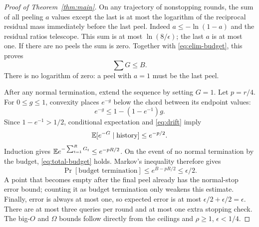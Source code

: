 \begin{proof}[Proof of Theorem~\ref{thm:main}]
On any trajectory of nonstopping rounds, the sum of all peeling $a$ values except the last is at most the logarithm of the reciprocal residual mass immediately before the last peel. Indeed $a\le-\ln(1-a)$ and the residual ratios telescope. This sum is at most $\ln(8/\epsilon)$; the last $a$ is at most one. If there are no peels the sum is zero. Together with \eqref{eq:elim-budget}, this proves
\begin{equation}\label{eq:total-budget}
 \sum G\le B.
\end{equation}
There is no logarithm of zero: a peel with $a=1$ must be the last peel.

After any normal termination, extend the sequence by setting $G=1$. Let $p=r/4$. For $0\le g\le1$, convexity places $e^{-g}$ below the chord between its endpoint values:
\[
 e^{-g}\le1-(1-e^{-1})g.
\]
Since $1-e^{-1}>1/2$, conditional expectation and \eqref{eq:drift} imply
\[
 \mathbb E[e^{-G}\mid\text{history}]\le e^{-p/2}.
\]
Induction gives $\mathbb E e^{-\sum_{t=1}^RG_t}\le e^{-pR/2}$. On the event of no normal termination by the budget, \eqref{eq:total-budget} holds. Markov's inequality therefore gives
\[
 \Pr[\text{budget termination}]
 \le e^{B-pR/2}\le\epsilon/2.
\]
A point that becomes empty after the final peel already has the normal-stop error bound; counting it as budget termination only weakens this estimate. Finally, error is always at most one, so expected error is at most $\epsilon/2+\epsilon/2=\epsilon$. There are at most three queries per round and at most one extra stopping check. The big-$O$ and $\Omega$ bounds follow directly from the ceilings and $\rho\ge1$, $\epsilon<1/4$.
\end{proof}

